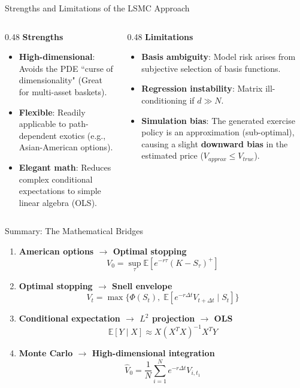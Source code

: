 \documentclass[10pt,aspectratio=169]{beamer}
\newcommand{\E}{\mathbb{E}}
\begin{document}
\begin{frame}{Strengths and Limitations of the LSMC Approach}

\begin{columns}[T] 
\begin{column}{0.48\textwidth}
\textbf{Strengths}
\begin{itemize}
  \setlength{\itemsep}{0.4em}
  \item \textbf{High-dimensional}: Avoids the PDE ``curse of dimensionality" (Great for multi-asset baskets).
  \item \textbf{Flexible}: Readily applicable to path-dependent exotics (e.g., Asian-American options).
  \item \textbf{Elegant math}: Reduces complex conditional expectations to simple linear algebra (OLS).
\end{itemize}
\end{column}
\begin{column}{0.48\textwidth}
\textbf{Limitations}
\begin{itemize}
  \setlength{\itemsep}{0.4em}
  \item \textbf{Basis ambiguity}: Model risk arises from subjective selection of basis functions.
  \item \textbf{Regression instability}: Matrix ill-conditioning if $d \gg N$.
  \item \textcolor{errorColor}{\textbf{Simulation bias}}: The generated exercise policy is an approximation (sub-optimal), causing a slight \textbf{downward bias} in the estimated price ($V_{approx} \le V_{true}$).
\end{itemize}
\end{column}
\end{columns}
\end{frame}

\begin{frame}{Summary: The Mathematical Bridges}

\begin{enumerate}
  \setlength{\itemsep}{0.6em}
  \item \textbf{American options $\rightarrow$ Optimal stopping}
  \[ V_0 = \sup_{\tau}\E[e^{-r\tau}(K-S_\tau)^+] \]
  \item \textbf{Optimal stopping $\rightarrow$ Snell envelope}
  \[ V_t = \max\{\Phi(S_t),\; \E[e^{-r\Delta t}V_{t+\Delta t}\mid S_t]\} \]
  \item \textbf{Conditional expectation $\rightarrow$ $L^2$ projection $\rightarrow$ OLS}
  \[ \E[Y\mid X] \approx X(X^TX)^{-1}X^TY \]
  \item \textbf{Monte Carlo $\rightarrow$ High-dimensional integration}
  \[ \hat{V}_0 = \frac{1}{N}\sum_{i=1}^N e^{-r\Delta t}V_{i,t_1} \]
\end{enumerate}

\end{frame}
\end{document}
